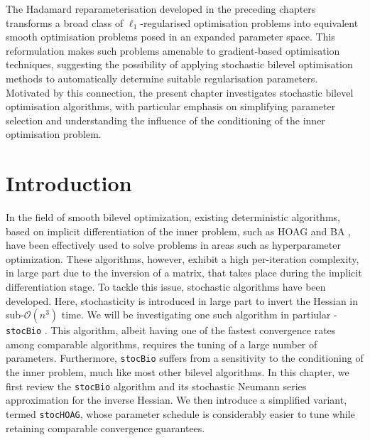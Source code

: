 \documentclass[11pt, twoside]{report}
\begin{document}
The Hadamard reparameterisation developed in the preceding chapters transforms a broad class of $\ell_1$-regularised optimisation problems into equivalent smooth optimisation problems posed in an expanded parameter space. This reformulation makes such problems amenable to gradient-based optimisation techniques, suggesting the possibility of applying stochastic bilevel optimisation methods to automatically determine suitable regularisation parameters. Motivated by this connection, the present chapter investigates stochastic bilevel optimisation algorithms, with particular emphasis on simplifying parameter selection and understanding the influence of the conditioning of the inner optimisation problem.
\section{Introduction}
In the field of smooth bilevel optimization, existing deterministic algorithms, based on implicit differentiation of the inner problem, such as HOAG \cite{pedregosa2016hyperparameter} and BA \cite{ghadimi2018approximation}, have been effectively used to solve problems in areas such as hyperparameter optimization. These algorithms, however, exhibit a high per-iteration complexity, in large part due to the inversion of a matrix, that takes place during the implicit differentiation stage. To tackle this issue, stochastic algorithms have been developed. Here, stochasticity is introduced in large part to invert the Hessian in sub-$\mathcal{O}(n^3)$ time. We will be investigating one such algorithm in partiular - \texttt{stocBio} \cite{ji2021bilevel}. This algorithm, albeit having one of the fastest convergence rates among comparable algorithms, requires the tuning of a large number of parameters. Furthermore, \texttt{stocBio} suffers from a sensitivity to the conditioning of the inner problem, much like most other bilevel algorithms. In this chapter, we first review the \texttt{stocBio} algorithm and its stochastic Neumann series approximation for the inverse Hessian. We then introduce a simplified variant, termed \texttt{stocHOAG}, whose parameter schedule is considerably easier to tune while retaining comparable convergence guarantees.
\end{document}
